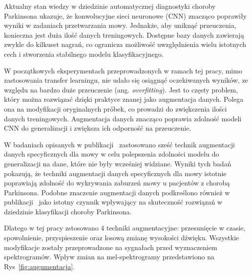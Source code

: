 Aktualny stan wiedzy w dziedzinie automatycznej diagnostyki choroby Parkinsona ukazuje, że konwolucyjne sieci neuronowe (CNN) znacząco poprawiły wyniki w zadaniach przetwarzania mowy.
Jednakże, aby uniknąć przeuczenia, konieczna jest duża ilość danych treningowych.
Dostępne bazy danych zawierają zwykle do kilkuset nagrań, co ogranicza możliwość uwzględnienia wielu istotnych cech i stworzenia stabilnego modelu klasyfikacyjnego.

W początkowych eksperymentach przeprowadzonych w ramach tej pracy, mimo zastosowania transfer learningu, nie udało się osiągnąć oczekiwanych wyników, ze względu na bardzo duże przeuczenie (ang. \emph{overfitting}).
Jest to częsty problem, który można rozwiązać dzięki praktyce znanej jako augmentacja danych.
Polega ona na modyfikacji oryginalnych próbek, co prowadzi do zwiększenia ilości danych treningowych.
Augmentacja danych znacząco poprawia zdolność modeli CNN do generalizacji i zwiększa ich odporność na przeuczenie.

W badaniach opisanych w publikacji~\cite{augmentation} zastosowano sześć technik augmentacji danych specyficznych dla mowy w celu polepszenia zdolności modelu do generalizacji na dane, które nie były wcześniej widziane.
Wyniki tych badań pokazują, że techniki augmentacji danych specyficznych dla mowy istotnie poprawiają zdolność do wykrywania zaburzeń mowy u pacjentów z chorobą Parkinsona.
Podobne znaczenie augmentacji danych podkreślono również w publikacji~\cite{Wodzinski} jako istotny czynnik wpływający na skuteczność rozwiązań w dziedzinie klasyfikacji choroby Parkinsona.

Dlatego w tej pracy zstosowano 4 techniki augmentacyjne: przesunięcie w czasie, spowolnienie, przyspieszenie oraz losową zmianę wysokości dźwięku.
Wszystkie modyfikacje zostały przeprowadzone na sygnałach przed wyznaczeniem spektrogramów.
Wpływ zmian na mel-spektrogramy przedstawiono na Rys~\ref{fig:augumentacja}.


